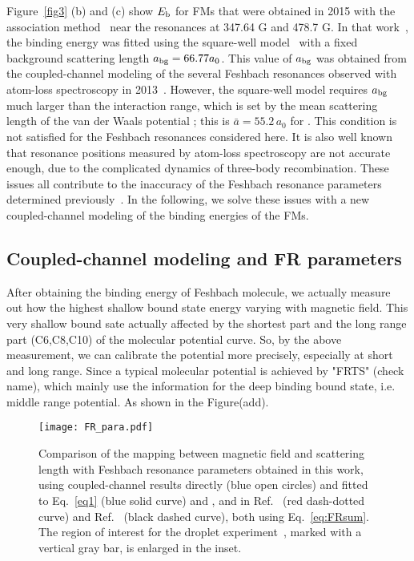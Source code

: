 Figure~\ref{fig3} (b) and (c) show $E_{\rm b}$ for FMs that were obtained in 2015 with the association method~\cite{wang2015} near the resonances at 347.64 G and 478.7 G. In that work~\cite{wang2015}, the binding energy was fitted using the square-well model~\cite{Lange2009} with a fixed background scattering length $a_{\rm bg} = 66.77a_0$. This value of $a_{\rm bg}$ was obtained from the coupled-channel modeling of the several Feshbach resonances observed with atom-loss spectroscopy in 2013~\cite{Wang2013}. However, the square-well model requires $a_{\rm bg}$ much larger than the interaction range, which is set by the mean scattering length of the van der Waals potential \cite{Gribakin1993}; this is $\bar{a} = 55.2\,a_0$ for \NaRb. This condition is not satisfied for the Feshbach resonances considered here. It is also well known that resonance positions measured by atom-loss spectroscopy are not accurate enough, due to the complicated dynamics of three-body recombination. These issues all contribute to the inaccuracy of the Feshbach resonance parameters determined previously~\cite{wang2015}. In the following, we solve these issues with a new coupled-channel modeling of the binding energies of the FMs.

\subsection{Coupled-channel modeling and FR parameters}

After obtaining the binding energy of Feshbach molecule, we actually measure out how the highest shallow bound state energy varying with magnetic field. This very shallow bound sate actually affected by the shortest part and the long range part (C6,C8,C10) of the molecular potential curve. So, by the above measurement, we can calibrate the potential more precisely, especially at short and long range. Since a typical molecular potential is achieved by "FRTS" (check name), which mainly use the information for the deep binding bound state, i.e. middle range  potential. As shown in the Figure(add). 

\begin{figure}[htbp]
\begin{center}
\texttt{[image: FR\_para.pdf]}
\end{center}
\caption[Scattering length as function of magnetic field]{Comparison of the mapping between magnetic field and scattering length with Feshbach resonance parameters obtained in this work, using coupled-channel results directly (blue open circles) and fitted to Eq.~\ref{eq1} (blue solid curve) and , and in Ref.~\cite{wang2015} (red dash-dotted curve) and Ref.~\cite{Wang2013} (black dashed curve), both using Eq.~\ref{eq:FRsum}. The region of interest for the droplet experiment~\cite{guo2021}, marked with a vertical gray bar, is enlarged in the inset. }
\label{FR_para}
\end{figure}


